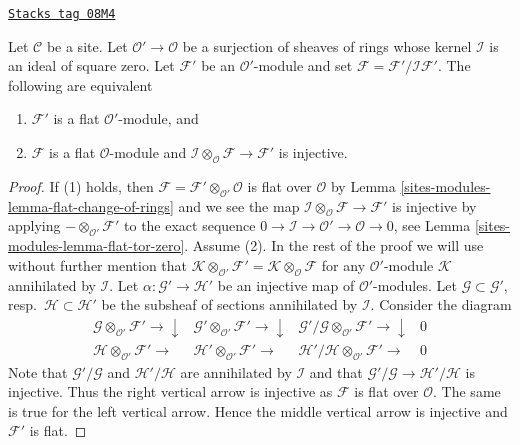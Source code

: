 \begin{lemma}
\label{sites-modules-lemma-flat-over-thickening}
\href{https://stacks.math.columbia.edu/tag/08M4}{\texttt{Stacks tag 08M4}}

Let $\mathcal{C}$ be a site. Let $\mathcal{O}' \to \mathcal{O}$
be a surjection of sheaves of rings whose kernel $\mathcal{I}$ is
an ideal of square zero. Let $\mathcal{F}'$ be an $\mathcal{O}'$-module
and set $\mathcal{F} = \mathcal{F}'/\mathcal{I}\mathcal{F}'$.
The following are equivalent
\begin{enumerate}
\item $\mathcal{F}'$ is a flat $\mathcal{O}'$-module, and
\item $\mathcal{F}$ is a flat $\mathcal{O}$-module and
$\mathcal{I} \otimes_\mathcal{O} \mathcal{F} \to \mathcal{F}'$
is injective.
\end{enumerate}
\end{lemma}

\begin{proof}
If (1) holds, then
$\mathcal{F} = \mathcal{F}' \otimes_{\mathcal{O}'} \mathcal{O}$ is
flat over $\mathcal{O}$ by
Lemma \ref{sites-modules-lemma-flat-change-of-rings}
and we see the map
$\mathcal{I} \otimes_\mathcal{O} \mathcal{F} \to \mathcal{F}'$
is injective by applying $- \otimes_{\mathcal{O}'} \mathcal{F}'$
to the exact sequence
$0 \to \mathcal{I} \to \mathcal{O}' \to \mathcal{O} \to 0$, see
Lemma \ref{sites-modules-lemma-flat-tor-zero}.
Assume (2). In the rest of the proof we will use without further mention
that $\mathcal{K} \otimes_{\mathcal{O}'} \mathcal{F}' =
\mathcal{K} \otimes_\mathcal{O} \mathcal{F}$
for any $\mathcal{O}'$-module $\mathcal{K}$ annihilated by $\mathcal{I}$.
Let $\alpha : \mathcal{G}' \to \mathcal{H}'$
be an injective map of $\mathcal{O}'$-modules. Let
$\mathcal{G} \subset \mathcal{G}'$, resp.\ $\mathcal{H} \subset \mathcal{H}'$
be the subsheaf of sections annihilated by $\mathcal{I}$.
Consider the diagram
$$
\begin{array}{cccc}\mathcal{G} \otimes_{\mathcal{O}'} \mathcal{F}' \longrightarrow\downarrow & \mathcal{G}' \otimes_{\mathcal{O}'} \mathcal{F}' \longrightarrow\downarrow & \mathcal{G}'/\mathcal{G} \otimes_{\mathcal{O}'} \mathcal{F}' \longrightarrow\downarrow & 0 \\ \mathcal{H} \otimes_{\mathcal{O}'} \mathcal{F}' \longrightarrow & \mathcal{H}' \otimes_{\mathcal{O}'} \mathcal{F}' \longrightarrow & \mathcal{H}'/\mathcal{H} \otimes_{\mathcal{O}'} \mathcal{F}' \longrightarrow & 0\end{array}
$$
Note that $\mathcal{G}'/\mathcal{G}$ and $\mathcal{H}'/\mathcal{H}$
are annihilated by $\mathcal{I}$ and that
$\mathcal{G}'/\mathcal{G} \to \mathcal{H}'/\mathcal{H}$ is injective.
Thus the right vertical arrow is injective as $\mathcal{F}$ is flat
over $\mathcal{O}$. The same is true for the left vertical arrow.
Hence the middle vertical arrow is injective and $\mathcal{F}'$ is flat.
\end{proof}


